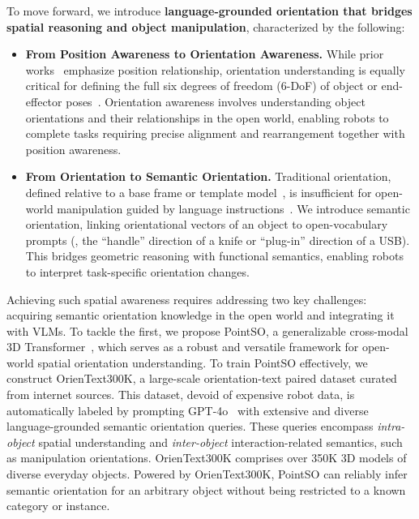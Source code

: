 To move forward, we introduce \textbf{language-grounded orientation that bridges spatial reasoning and object manipulation}, characterized by the following:
\begin{itemize}
\item \textbf{From Position Awareness to Orientation Awareness.}
While prior works~\cite{SpatialVLM24,SpatialRGPT24,SpatialBot24} emphasize position relationship, orientation understanding is equally critical for defining the full six degrees of freedom (6-DoF) of object or end-effector poses~\cite{OV6DOFPose24,FoundationPose24,PoseCNN18,ManipLLM24,ManipulabilityME85,ManipulateAnything24}. Orientation awareness involves understanding object orientations and their relationships in the open world, enabling robots to complete tasks requiring precise alignment and rearrangement together with position awareness.

\item \textbf{From Orientation to Semantic Orientation.}
Traditional orientation, defined relative to a base frame or template model~\cite{PoseCNN18,OnePose22,MegaPose22,FoundationPose24,OV6DOFPose24}, is insufficient for open-world manipulation guided by language instructions~\cite{LanguageInstructRobots11,SayCan22,OWManipVLM23}. We introduce semantic orientation, linking orientational vectors of an object to open-vocabulary prompts (\eg, the ``handle'' direction of a knife or ``plug-in'' direction of a USB). This bridges geometric reasoning with functional semantics, enabling robots to interpret task-specific orientation changes.
\end{itemize}

Achieving such spatial awareness requires addressing two key challenges: acquiring semantic orientation knowledge in the open world and integrating it with VLMs. To tackle the first, we propose PointSO, a generalizable cross-modal 3D Transformer~\cite{AttentionIsAllYouNeed,ACT23,ReCon23,ShapeLLM24}, which serves as a robust and versatile framework for open-world spatial orientation understanding. To train PointSO effectively, we construct OrienText300K, a large-scale orientation-text paired dataset curated from internet sources. This dataset, devoid of expensive robot data, is automatically labeled by prompting GPT-4o~\cite{GPT4o24} with extensive and diverse language-grounded semantic orientation queries. These queries encompass \textit{intra-object} spatial understanding and \textit{inter-object} interaction-related semantics, such as manipulation orientations. OrienText300K comprises over 350K 3D models of diverse everyday objects. Powered by OrienText300K, PointSO can reliably infer semantic orientation for an arbitrary object without being restricted to a known category or instance.

